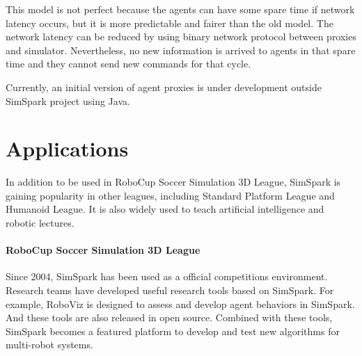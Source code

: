 \documentclass{llncs}
\begin{document}
This model is not perfect because the agents can have some spare time if network latency
occurs, but it is more predictable and fairer than the old model.
The network latency can be reduced by using binary network protocol between proxies and simulator.
Nevertheless, no new information is arrived to agents in that spare time and they cannot send new 
commands for that cycle.

Currently, an initial version of agent proxies is under development outside SimSpark
project using Java.




\section{Applications}
In addition to be used in RoboCup Soccer Simulation 3D League, SimSpark is gaining popularity in other leagues, including Standard Platform League and Humanoid League. It is also widely used to teach artificial intelligence and robotic lectures.

\label{s:application}
\paragraph{RoboCup Soccer Simulation 3D League} Since 2004, SimSpark has been used as a official competitions environment. Research teams have developed useful research tools based on SimSpark.
For example, RoboViz\cite{Stoecker2012} is designed to assess and develop agent behaviors in SimSpark. And these tools are also released in open source.
Combined with these tools, SimSpark becomes a featured platform to develop and test new algorithms for multi-robot systems.
\end{document}
